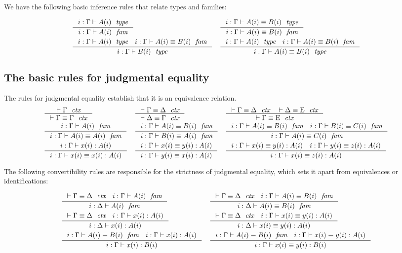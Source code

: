 We have the following basic inference rules that relate types and families:

\begin{small}
\begin{align*}
& \inference
  {\jvtype{i}{\Gamma}{A}}
  {\jvfam{i}{\Gamma}{A}}
& & \inference
    {\jvtypeeq{i}{\Gamma}{A}{B}}
    {\jvfameq{i}{\Gamma}{A}{B}}\\
& \inference
  {\jvtype{i}{\Gamma}{A}
   \jvfameq{i}{\Gamma}{A}{B}}
  {\jvtype{i}{\Gamma}{B}}
& & \inference
    {\jvtype{i}{\Gamma}{A}
     \jvfameq{i}{\Gamma}{A}{B}}
    {\jvtypeeq{i}{\Gamma}{A}{B}}
\end{align*}
\end{small}

\subsection{The basic rules for judgmental equality}
The rules for judgmental equality establish that it is an equivalence relation.
\bgroup\small
\begin{align*}
& \inference
  {\jvctx{\Gamma}}
  {\jvctxeq{\Gamma}{\Gamma}} 
& & \inference
    {\jvctxeq{\Gamma}{\Delta}}
    {\jvctxeq{\Delta}{\Gamma}} 
& & \inference
    {\jvctxeq{\Gamma}{\Delta}
     \jvctxeq{\Delta}{\greek{E}}}
    {\jvctxeq{\Gamma}{\greek{E}}}\\
& \inference
  {\jvfam{i}{\Gamma}{A}}
  {\jvfameq{i}{\Gamma}{A}{A}} 
& & \inference
    {\jvfameq{i}{\Gamma}{A}{B}}
    {\jvfameq{i}{\Gamma}{B}{A}}
& & \inference
    {\jvfameq{i}{\Gamma}{A}{B}
     \jvfameq{i}{\Gamma}{B}{C}}
    {\jvfameq{i}{\Gamma}{A}{C}}\\
& \inference
  {\jvterm{i}{\Gamma}{A}{x}}
  {\jvtermeq{i}{\Gamma}{A}{x}{x}}
& & \inference
    {\jvtermeq{i}{\Gamma}{A}{x}{y}}
    {\jvtermeq{i}{\Gamma}{A}{y}{x}}
& & \inference
    {\jvtermeq{i}{\Gamma}{A}{x}{y}
     \jvtermeq{i}{\Gamma}{A}{y}{z}}
    {\jvtermeq{i}{\Gamma}{A}{x}{z}}
\end{align*}
\egroup

The following convertibility rules are responsible for the strictness
of judgmental equality, which sets it apart from equivalences or identifications:

\begin{align*}
& \inference
  {\jvctxeq{\Gamma}{\Delta}
   \jvfam{i}{\Gamma}{A}}
  {\jvfam{i}{\Delta}{A}}
& & \inference
    {\jvctxeq{\Gamma}{\Delta}
     \jvfameq{i}{\Gamma}{A}{B}}
    {\jvfameq{i}{\Delta}{A}{B}}\\
& \inference
  {\jvctxeq{\Gamma}{\Delta}
   \jvterm{i}{\Gamma}{A}{x}}
  {\jvterm{i}{\Delta}{A}{x}}
& & \inference
    {\jvctxeq{\Gamma}{\Delta}
     \jvtermeq{i}{\Gamma}{A}{x}{y}}
    {\jvtermeq{i}{\Delta}{A}{x}{y}}\\
& \inference
  {\jvfameq{i}{\Gamma}{A}{B}
   \jvterm{i}{\Gamma}{A}{x}}
  {\jvterm{i}{\Gamma}{B}{x}}
& & \inference
    {\jvfameq{i}{\Gamma}{A}{B}
     \jvtermeq{i}{\Gamma}{A}{x}{y}}
    {\jvtermeq{i}{\Gamma}{B}{x}{y}}
\end{align*}

